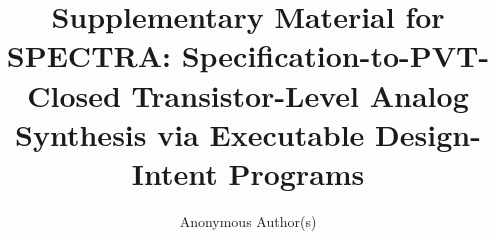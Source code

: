 \documentclass[sigconf,review,anonymous]{acmart}
\begin{document}
\title[Supplementary Material for SPECTRA]{Supplementary Material for SPECTRA: Specification-to-PVT-Closed Transistor-Level Analog Synthesis via Executable Design-Intent Programs}
\author{Anonymous Author(s)}
\maketitle



\clearpage

\renewcommand{\bibfont}{\fontsize{6.6}{7.4}\selectfont}
\setlength{\bibsep}{0.6pt}

\end{document}

